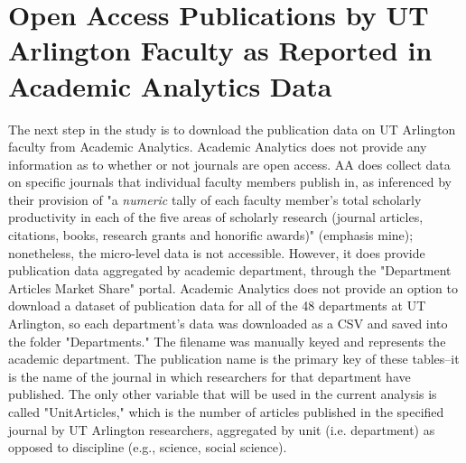 \documentclass{article}
\begin{document}
\section{Open Access Publications by UT Arlington Faculty as Reported in Academic Analytics Data}
The next step in the study is to download the publication data on UT Arlington faculty from Academic Analytics.
Academic Analytics does not provide any information as to whether or not journals are open access. 
AA does collect data on specific journals that individual faculty members publish in, as inferenced by their provision of "a \textit{numeric} tally of each faculty member’s total scholarly productivity in each of the five areas of scholarly research (journal articles, citations, books, research grants and honorific awards)" (emphasis mine); nonetheless, the micro-level data is not accessible. 
However, it does provide publication data aggregated by academic department, through the "Department Articles Market Share" portal. 
Academic Analytics does not provide an option to download a dataset of publication data for all of the 48 departments at UT Arlington, so each department's data was downloaded as a CSV and saved into the folder "Departments."
The filename was manually keyed and represents the academic department.
The publication name is the primary key of these tables--it is the name of the journal in which researchers for that department have published.
The only other variable that will be used in the current analysis is called "UnitArticles," which is the number of articles published in the specified journal by UT Arlington researchers, aggregated by unit (i.e. department) as opposed to discipline (e.g., science, social science).
\end{document}
